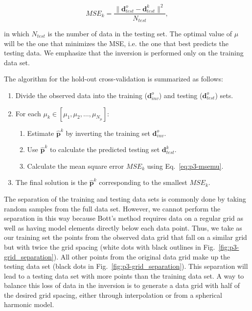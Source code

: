 \begin{equation}
    MSE_k = \dfrac{\|\mathbf{d}^o_{test} - \mathbf{d}^k_{test}\|^2}{N_{test}},
    \label{eq:p3-msemu}
\end{equation}

\noindent
in which $N_{test}$ is the number of data in the testing set.
The optimal value of $\mu$ will be the one that minimizes the MSE,
i.e. the one that best predicts the testing data.
We emphasize that the inversion is performed only on the training data set.

The algorithm for the hold-out cross-validation is summarized as follows:

\begin{enumerate}
    \item Divide the observed data into
        the training ($\mathbf{d}^o_{inv}$)
        and testing ($\mathbf{d}^o_{test}$) sets.
    \item For each $\mu_k \in [\mu_1, \mu_2, \ldots, \mu_{N_{\mu}}]$:
    \begin{enumerate}
        \item Estimate $\mathbf{\hat{p}}^k$ by inverting the training set
            $\mathbf{d}^o_{inv}$.
        \item Use $\mathbf{\hat{p}}^k$ to calculate the predicted testing set
            $\mathbf{d}^k_{test}$.
        \item Calculate the mean square error $MSE_k$ using Eq.~\ref{eq:p3-msemu}.
    \end{enumerate}
    \item The final solution is the $\mathbf{\hat{p}}^k$ corresponding to the
        smallest $MSE_k$.
\end{enumerate}

The separation of the training and testing data sets is commonly done by taking
random samples from the full data set.
However, we cannot perform the separation in this way because
Bott's method requires data on a regular grid as well as having model elements
directly below each data point.
Thus, we take as our training set the points from the observed data grid that
fall on a similar grid but with twice the grid spacing
(white dots with black outlines in Fig.~\ref{fig:p3-grid_separation}).
All other points from the original data grid
make up the testing data set
(black dots in Fig.~\ref{fig:p3-grid_separation}).
This separation will lead to
a testing data set with more points than the training data set.
A way to balance this loss of data in the inversion
is to generate a data grid with half of the desired grid spacing,
either through interpolation
or from a spherical harmonic model.



